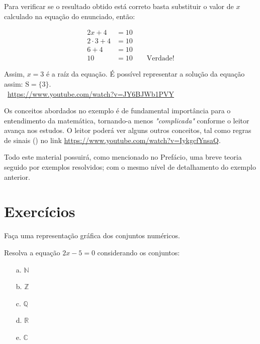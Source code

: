 \begin{example}
Para verificar se o resultado obtido está correto basta substituir o valor de $x$ calculado na equação do enunciado, então:

\begin{ceqn}
	\begin{align*}
	2x+4 &= 10 \\
	2 \cdot 3 +4 &= 10 \\
	6+4 &= 10 \\
	10 &= 10 \qquad \mathrm{Verdade!}
	\end{align*}
\end{ceqn}

Assim, $x=3$ é a raíz da equação. É possível representar a solução da equação assim: $\mathrm{S}=\{3\}$.
\\

\doutor \, \url{https://www.youtube.com/watch?v=JY6BJWb1PVY}

\end{example}

Os conceitos abordados no exemplo é de fundamental importância para o entendimento da matemática, tornando-a menos \textit{"complicada"} conforme o leitor avança nos estudos. O leitor poderá ver alguns outros conceitos, tal como regras de sinais (\video) no link \url{https://www.youtube.com/watch?v=IykgcfYnsaQ}.

Todo este material possuirá, como mencionado no Prefácio, uma breve teoria seguido por exemplos resolvidos; com o mesmo nível de detalhamento do exemplo anterior.

\section{Exercícios}

\begin{exercise}
	Faça uma representação gráfica dos conjuntos numéricos.
\end{exercise}

\begin{exercise}
	Resolva a equação $2x-5=0$ considerando os conjuntos:
	\begin{itemize}
		\item[a.]{$\mathbb{N}$}
		\item[b.]{$\mathbb{Z}$}
		\item[c.]{$\mathbb{Q}$}
		\item[d.]{$\mathbb{R}$}
		\item[e.]{$\mathbb{C}$}
	\end{itemize}
\end{exercise}


